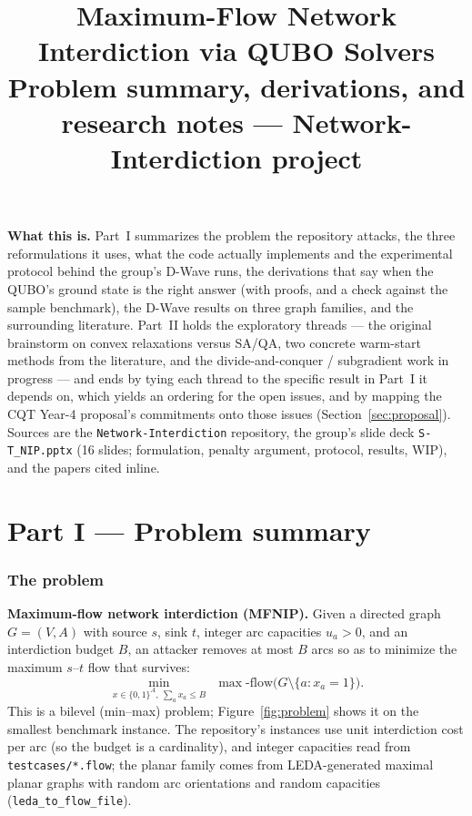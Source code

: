 \documentclass[11pt]{article}
\title{\vspace{-1.5em}Maximum-Flow Network Interdiction via QUBO Solvers\\
\large Problem summary, derivations, and research notes --- Network-Interdiction project}
\author{}
\date{}
\newcommand{\code}[1]{\texttt{#1}}
\begin{document}
\sloppy
\maketitle
\vspace{-2em}

\textbf{What this is.} Part~I summarizes the problem the repository attacks, the three reformulations it uses, what the code actually implements and the experimental protocol behind the group's D-Wave runs, the derivations that say when the QUBO's ground state is the right answer (with proofs, and a check against the sample benchmark), the D-Wave results on three graph families, and the surrounding literature. Part~II holds the exploratory threads --- the original brainstorm on convex relaxations versus SA/QA, two concrete warm-start methods from the literature, and the divide-and-conquer / subgradient work in progress --- and ends by tying each thread to the specific result in Part~I it depends on, which yields an ordering for the open issues, and by mapping the CQT Year-4 proposal's commitments onto those issues (Section~\ref{sec:proposal}). Sources are the \code{Network-Interdiction} repository, the group's slide deck \code{S-T\_NIP.pptx} (16 slides; formulation, penalty argument, protocol, results, WIP), and the papers cited inline.

\tableofcontents

\part*{Part I --- Problem summary}

\section{The problem}

\textbf{Maximum-flow network interdiction (MFNIP).} Given a directed graph $G=(V,A)$ with source $s$, sink $t$, integer arc capacities $u_a > 0$, and an interdiction budget $B$, an attacker removes at most $B$ arcs so as to minimize the maximum $s$--$t$ flow that survives:
\begin{equation}
\label{eq:bilevel}
\min_{x \in \{0,1\}^A,\ \sum_a x_a \le B}\ \ \max\text{-flow}\bigl(G \setminus \{a : x_a = 1\}\bigr).
\end{equation}
This is a bilevel (min--max) problem; Figure~\ref{fig:problem} shows it on the smallest benchmark instance. The repository's instances use unit interdiction cost per arc (so the budget is a cardinality), and integer capacities read from \code{testcases/*.flow}; the planar family comes from LEDA-generated maximal planar graphs with random arc orientations and random capacities (\code{leda\_to\_flow\_file}).
\end{document}
